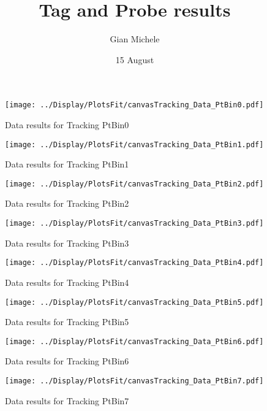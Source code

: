 \documentclass{article}
\begin{document}
\title{Tag and Probe results }
\author{Gian Michele}
\date{15 August}


\maketitle



\begin{figure}
    \texttt{[image: ../Display/PlotsFit/canvasTracking\_Data\_PtBin0.pdf]}
    \caption{Data results for Tracking PtBin0 }
\end{figure}

\begin{figure}
    \texttt{[image: ../Display/PlotsFit/canvasTracking\_Data\_PtBin1.pdf]}
    \caption{Data results for Tracking PtBin1 }
\end{figure}

\begin{figure}
    \texttt{[image: ../Display/PlotsFit/canvasTracking\_Data\_PtBin2.pdf]}
    \caption{Data results for Tracking PtBin2 }
\end{figure}

\begin{figure}
    \texttt{[image: ../Display/PlotsFit/canvasTracking\_Data\_PtBin3.pdf]}
    \caption{Data results for Tracking PtBin3 }
\end{figure}

\begin{figure}
    \texttt{[image: ../Display/PlotsFit/canvasTracking\_Data\_PtBin4.pdf]}
    \caption{Data results for Tracking PtBin4 }
\end{figure}

\begin{figure}
    \texttt{[image: ../Display/PlotsFit/canvasTracking\_Data\_PtBin5.pdf]}
    \caption{Data results for Tracking PtBin5 }
\end{figure}

\begin{figure}
    \texttt{[image: ../Display/PlotsFit/canvasTracking\_Data\_PtBin6.pdf]}
    \caption{Data results for Tracking PtBin6 }
\end{figure}

\begin{figure}
    \texttt{[image: ../Display/PlotsFit/canvasTracking\_Data\_PtBin7.pdf]}
    \caption{Data results for Tracking PtBin7 }
\end{figure}
\end{document}
